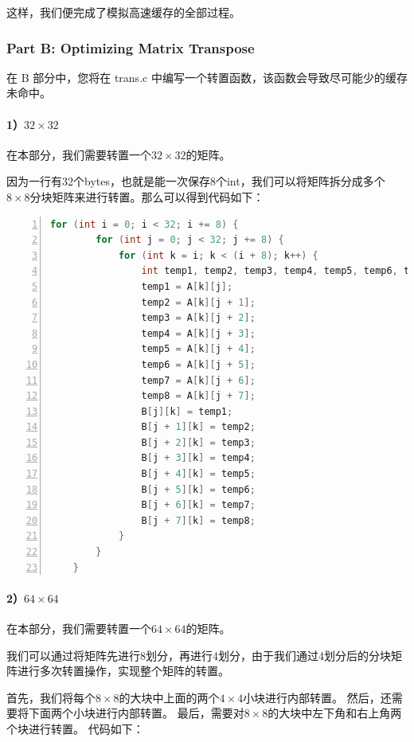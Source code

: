 \documentclass{article}
\begin{document}
这样，我们便完成了模拟高速缓存的全部过程。

\subsubsection{Part B: Optimizing Matrix Transpose}

在 B 部分中，您将在 trans.c 中编写一个转置函数，该函数会导致尽可能少的缓存未命中。

\paragraph*{1）$32 \times 32$}
在本部分，我们需要转置一个$32 \times 32$的矩阵。

因为一行有32个bytes，也就是能一次保存8个int，我们可以将矩阵拆分成多个$8 \times 8$分块矩阵来进行转置。那么可以得到代码如下：

\begin{lstlisting}[xleftmargin = 4em,xrightmargin = 4em, aboveskip = 1em, numbers = left, language = C]
    for (int i = 0; i < 32; i += 8) {
        for (int j = 0; j < 32; j += 8) {
            for (int k = i; k < (i + 8); k++) {
                int temp1, temp2, temp3, temp4, temp5, temp6, temp7, temp8;
                temp1 = A[k][j];
                temp2 = A[k][j + 1];
                temp3 = A[k][j + 2];
                temp4 = A[k][j + 3];
                temp5 = A[k][j + 4];
                temp6 = A[k][j + 5];
                temp7 = A[k][j + 6];
                temp8 = A[k][j + 7];
                B[j][k] = temp1;
                B[j + 1][k] = temp2;
                B[j + 2][k] = temp3;
                B[j + 3][k] = temp4;
                B[j + 4][k] = temp5;
                B[j + 5][k] = temp6;
                B[j + 6][k] = temp7;
                B[j + 7][k] = temp8;
            }
        }
    }
\end{lstlisting}

\paragraph*{2）$64 \times 64$}
在本部分，我们需要转置一个$64 \times 64$的矩阵。

我们可以通过将矩阵先进行8划分，再进行4划分，由于我们通过4划分后的分块矩阵进行多次转置操作，实现整个矩阵的转置。

首先，我们将每个$8 \times 8$的大块中上面的两个$4 \times 4$小块进行内部转置。
然后，还需要将下面两个小块进行内部转置。
最后，需要对$8 \times 8$的大块中左下角和右上角两个块进行转置。
代码如下：
\end{document}
